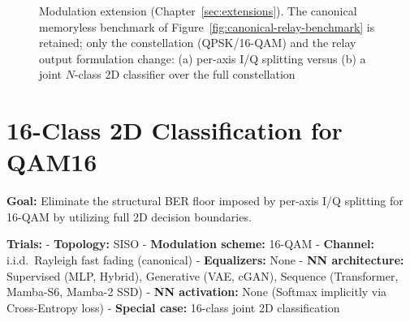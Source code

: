 \begin{figure}[htbp]
\noindent
{}
\caption[Modulation extension]{Modulation extension (Chapter~\ref{sec:extensions}). The canonical memoryless benchmark of Figure~\ref{fig:canonical-relay-benchmark} is retained; only the constellation (QPSK/16-QAM) and the relay output formulation change: (a) per-axis I/Q splitting versus (b) a joint $N$-class 2D classifier over the full constellation}
\label{fig:ext-modulation}
\end{figure}

\section{16-Class 2D Classification for QAM16}\label{sec:class-2d-classification-for-qam16}

\textbf{Goal:} Eliminate the structural BER floor imposed by per-axis I/Q splitting for 16-QAM by utilizing full 2D decision boundaries.

\textbf{Trials:} - \textbf{Topology:} SISO - \textbf{Modulation scheme:} 16-QAM - \textbf{Channel:} i.i.d.\ Rayleigh fast fading (canonical) - \textbf{Equalizers:} None - \textbf{NN architecture:} Supervised (MLP, Hybrid), Generative (VAE, cGAN), Sequence (Transformer, Mamba-S6, Mamba-2 SSD) - \textbf{NN activation:} None (Softmax implicitly via Cross-Entropy loss) - \textbf{Special case:} 16-class joint 2D classification

